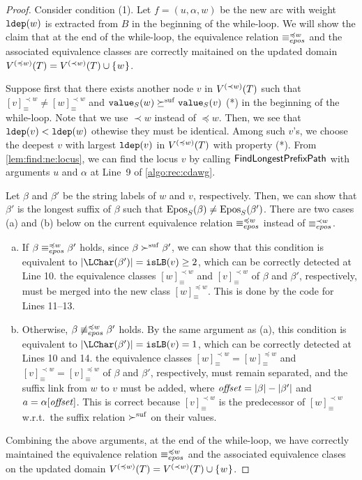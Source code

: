 \documentclass{article}
\begin{document}
\begin{proof}
Consider condition (1). Let $f = (u, \alpha, w)$ be the new arc with weight $\ldep(w)$ is extracted from $B$ in the beginning of the while-loop.
We will show the claim that at the end of the while-loop, the equivalence relation $\eqepos[\preceq w]$ and the associated equivalence classes are correctly maitained on the updated domain $V\rk{\preceq w}(T) = V\rk{\prec w}(T) \cup \set{w}$. 

Suppose first that there exists another node $v$ in $V\rk{\prec w}(T)$ such that $[v]^{\prec w}_{\equiv} \not= [w]^{\prec w}_{\equiv}$ and $\Value(w) \succeqsuf \Value(v)$ (*) in the beginning of the while-loop. Note that we use $\prec w$ instead of $\preceq w$. Then, we see that $\ldep(v) < \ldep(w)$ othewise they must be identical. 
Among such $v$'s, we choose the deepest $v$ with largest $\ldep(v)$ in $V\rk{\preceq w}(T)$ with property (*).
From \cref{lem:find:ne:locus}, we can find the locus $v$ by calling $\FindNonEquivLocus$ with arguments $u$ and $\alpha$ at Line~9 of \cref{algo:rec:cdawg}. 


Let $\beta$ and $\beta'$ be the string labels of $w$ and $v$, respectively. Then, we can show that $\beta'$ is the longest suffix of $\beta$ such that $\Epos(\beta) \not= \Epos(\beta')$.
There are two cases (a) and (b) below on the current equivalence relation $\eqepos[\preceq w]$ instead of $\eqepos[\prec w]$. 
\begin{enumerate}[(a)]
\item If $\beta \eqepos[\preceq w] \beta'$ holds, since $\beta \succsuf \beta'$, we can show that this condition is equivalent to $|\LChar(\beta')| = \op{isLB}(v) \ge 2$, which can be correctly detected at Line 10. 
  the equivalence classes $[w]^{\prec w}_{\equiv}$ and $[v]^{\prec w}_{\equiv}$ of $\beta$ and $\beta'$, respectively, must be merged into the new class $[w]^{\preceq w}_{\equiv}$. This is done by the code for Lines 11--13. 
  
\item Otherwise, $\beta \not\eqepos[\preceq w] \beta'$ holds. By the same argument as (a), this condition is equivalent to $|\LChar(\beta')| = \op{isLB}(v) = 1$, which can be correctly detected at Lines 10 and 14.
  the equivalence classes $[w]^{\prec w}_{\equiv} = [w]^{\preceq w}_{\equiv}$ and $[v]^{\prec w}_{\equiv} = [v]^{\preceq w}_{\equiv}$  of $\beta$ and $\beta'$, respectively, must remain separated, and the suffix link from $w$ to $v$ must be added, where $\id{offset} = |\beta| - |\beta'|$ and $a = \alpha[\id{offset}]$. 
  This is correct because $[v]^{\prec w}_{\equiv}$ is the predecessor of $[w]^{\prec w}_{\equiv}$ w.r.t.~the suffix relation $\succsuf$ on their values.
\end{enumerate}

Combining the above arguments, at the end of the while-loop, we have correctly maintained the equivalence relation $\eqepos[\preceq w]$ and the associated equivalence clases on the updated domain $V\rk{\preceq w}(T) = V\rk{\prec w}(T) \cup \set{w}$.
\end{proof}
\end{document}
